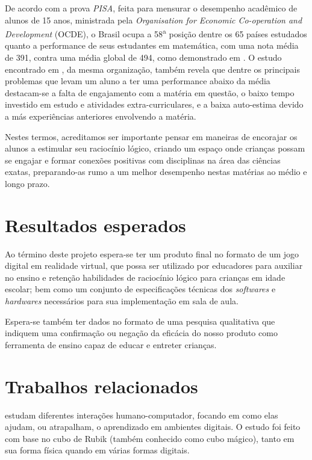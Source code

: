 De acordo com a prova \textit{PISA}, feita para mensurar o desempenho acadêmico de alunos de 15 anos, ministrada pela \textit{Organisation for Economic Co-operation and Development} (OCDE), o Brasil ocupa a 58\textsuperscript{a} posição dentre os 65 países estudados quanto a performance de seus estudantes em matemática, com uma nota média de 391, contra uma média global de 494, como demonstrado em \cite{OECD:2012:pisa-brazil}. 
O estudo encontrado em \cite{OECD:2016:low_performing_students}, da mesma organização, também revela que dentre os principais problemas que levam um aluno a ter uma performance abaixo da média destacam-se a falta de engajamento com a matéria em questão, o baixo tempo investido em estudo e atividades extra-curriculares, e a baixa auto-estima devido a más experiências anteriores envolvendo a matéria.

Nestes termos, acreditamos ser importante pensar em maneiras de encorajar os alunos a estimular seu raciocínio lógico, criando um espaço onde crianças possam se engajar e formar conexões positivas com disciplinas na área das ciências exatas, preparando-as rumo a um melhor desempenho nestas matérias ao médio e longo prazo.

\section{Resultados esperados}\label{sec-resultados-esperados}

Ao término deste projeto espera-se ter um produto final no formato de um jogo digital em realidade virtual, que possa ser utilizado por educadores para auxiliar no ensino e retenção habilidades de raciocínio lógico para crianças em idade escolar; bem como um conjunto de especificações técnicas dos \textit{softwares} e \textit{hardwares} necessários para sua implementação em sala de aula.

Espera-se também ter dados no formato de uma pesquisa qualitativa que indiquem uma confirmação ou negação da eficácia do nosso produto como ferramenta de ensino capaz de educar e entreter crianças.

\section{Trabalhos relacionados}\label{sec-trabalhos-relacionados}

\cite{Tabuti:2010:analise} estudam diferentes interações humano-computador, 
focando em como elas ajudam, ou atrapalham, o aprendizado em ambientes 
digitais. O estudo foi feito com base no cubo de Rubik (também conhecido como cubo mágico), tanto em sua forma física quando em várias formas digitais.

